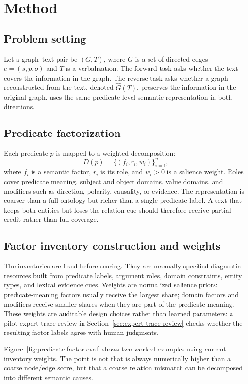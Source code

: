 \section{Method}
\subsection{Problem setting}
Let a graph--text pair be \((G,T)\), where \(G\) is a set of directed edges \(e=(s,p,o)\) and \(T\) is a verbalization. The forward task asks whether the text covers the information in the graph. The reverse task asks whether a graph reconstructed from the text, denoted \(\hat{G}(T)\), preserves the information in the original graph. \lemonscore{} uses the same predicate-level semantic representation in both directions.

\subsection{Predicate factorization}
Each predicate \(p\) is mapped to a weighted decomposition:
\[
D(p)=\{(f_i,r_i,w_i)\}_{i=1}^{n},
\]
where \(f_i\) is a semantic factor, \(r_i\) is its role, and \(w_i>0\) is a salience weight. Roles cover predicate meaning, subject and object domains, value domains, and modifiers such as direction, polarity, causality, or evidence. The representation is coarser than a full ontology but richer than a single predicate label. A text that keeps both entities but loses the relation cue should therefore receive partial credit rather than full coverage.

\subsection{Factor inventory construction and weights}
The inventories are fixed before scoring. They are manually specified diagnostic resources built from predicate labels, argument roles, domain constraints, entity types, and lexical evidence cues. Weights are normalized salience priors: predicate-meaning factors usually receive the largest share; domain factors and modifiers receive smaller shares when they are part of the predicate meaning. These weights are auditable design choices rather than learned parameters; a pilot expert trace review in Section~\ref{sec:expert-trace-review} checks whether the resulting factor labels agree with human judgments.

Figure~\ref{fig:predicate-factor-eval} shows two worked examples using current inventory weights. The point is not that \lemonscore{} is always numerically higher than a coarse node/edge score, but that a coarse relation mismatch can be decomposed into different semantic causes.

